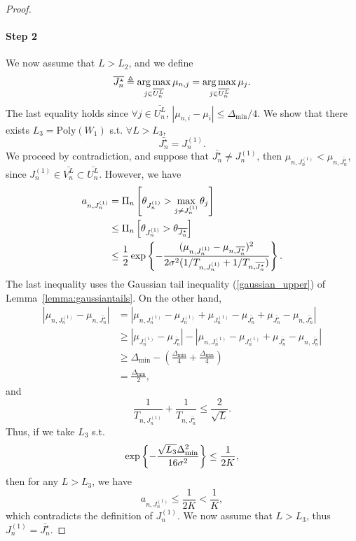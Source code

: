 \begin{proof}
    \paragraph{Step 2} We now assume that $L > L_2$, and we define 
    \[
        \overline{J_n^\star} \triangleq \operatorname*{arg\,max}_{j\in\overline{U_n^L}} \mu_{n,j} = \operatorname*{arg\,max}_{j\in\overline{U_n^L}} \mu_j.
    \]
    The last equality holds since $\forall j \in \bar{U_n^L}$, $|\mu_{n,i}-\mu_i| \leq \Delta_{\text{min}}/4$. We show that there exists $L_3 = \text{Poly}(W_1)$ s.t. $\forall L > L_3$, 
    \[
        \bar{J_n^\star} = J_n^{(1)}.
    \] We proceed by contradiction, and suppose that $\bar{J_n^\star} \neq J_n^{(1)}$, then $\mu_{n,J_n^{(1)}} < \mu_{n,\bar{J_n^\star}}$, since $J_n^{(1)} \in \bar{V_n^L} \subset \bar{U_n^L}$. However, we have
    \begin{align*}
        a_{n,J_n^{(1)}} &= \Pi_{n}\left[\theta_{J_n^{(1)}} > \max_{j\neq J_n^{(1)}}\theta_j\right]\\
                             &\leq \Pi_{n}\left[\theta_{J_n^{(1)}} > \theta_{\overline{J_n^\star}}\right]\\
                             &\leq \frac{1}{2}\exp\left\{-\frac{(\mu_{n,J_n^{(1)}}-\mu_{n,\overline{J_n^\star}})^2}{2\sigma^2(1/T_{n,J_n^{(1)}}+1/T_{n,\overline{J_n^\star}})}\right\}.
    \end{align*}
    The last inequality uses the Gaussian tail inequality (\ref{gaussian_upper}) of Lemma~\ref{lemma:gaussiantails}. On the other hand,
    \begin{align*}
        |\mu_{n,J_n^{(1)}} - \mu_{n,\bar{J_n^\star}}| &= |\mu_{n,J_n^{(1)}} - \mu_{J_n^{(1)}} + \mu_{J_n^{(1)}} - \mu_{\bar{J_n^\star}} + \mu_{\bar{J_n^\star}} -\mu_{n,\bar{J_n^\star}}|\\
                                                      &\geq
        |\mu_{J_n^{(1)}} - \mu_{\bar{J_n^\star}}| - |\mu_{n,J_n^{(1)}} - \mu_{J_n^{(1)}} + \mu_{\bar{J_n^\star}} -\mu_{n,\bar{J_n^\star}}|\\
                                                      &\geq
        \Delta_{\text{min}} - (\frac{\Delta_{\text{min}}}{4} + \frac{\Delta_{\text{min}}}{4})\\
                                                      &=
        \frac{\Delta_{\text{min}}}{2},
    \end{align*}
    and
    \[
        \frac{1}{T_{n,J_n^{(1)}}}+\frac{1}{T_{n,\bar{J_n^\star}}} \leq \frac{2}{\sqrt{L}}.
    \]
    Thus, if we take $L_3$ s.t. 
    \[
        \exp\left\{-\frac{\sqrt{L_3}\Delta_{\text{min}}^2}{16\sigma^2}\right\} \leq \frac{1}{2K},
    \]
    then for any $L > L_3$, we have
    \[
        a_{n,J_n^{(1)}} \leq \frac{1}{2K} < \frac{1}{K},
    \]
    which contradicts the definition of $J_n^{(1)}$. We now assume that $L > L_3$, thus $J_n^{(1)}=\bar{J_n^\star}$.
    

\end{proof}
